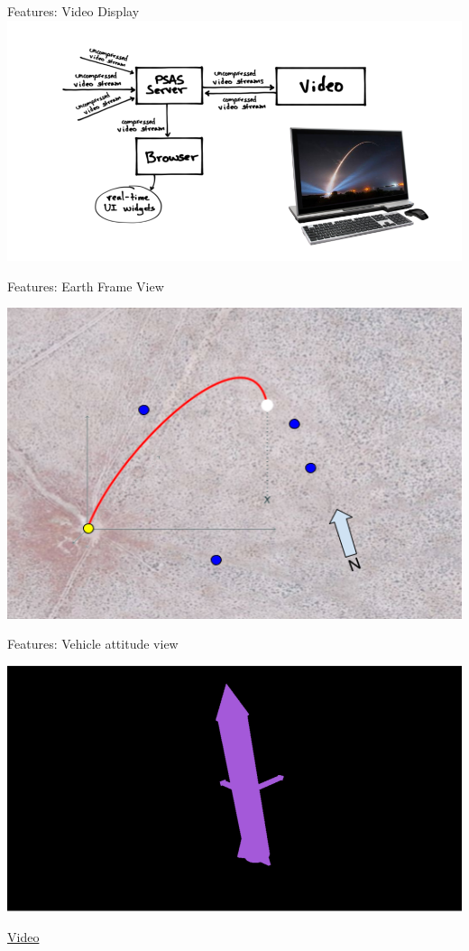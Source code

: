 \documentclass[smaller, aspectratio=169]{beamer}
\begin{document}
  \begin{frame}{Features: Video Display}
    \includegraphics[scale=.4]{./imgs/video.png}
  \end{frame}

  \begin{frame}{Features: Earth Frame View}
    \begin{center}
      \includegraphics[scale=.5]{./imgs/efv.png}
    \end{center}
  \end{frame}

  \begin{frame}{Features: Vehicle attitude view}
    \begin{center}
      \includegraphics[scale=.33]{./imgs/attitude.png}
    \end{center}
    \href{https://youtu.be/SqB1a36bGHA}{Video}
  \end{frame}
\end{document}
